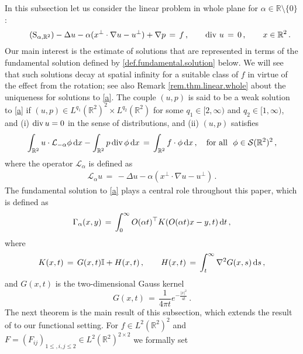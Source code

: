 \documentclass[11pt,a4paper]{article}
\newcommand{\R}{\mathbb{R}}
\newcommand{\dd}{\,{\rm d}}
\begin{document}
In this subsection let us consider the linear problem in whole plane for $\alpha\in \R \setminus \{0\}$:
%
\begin{equation}\tag{${\rm S}_{\alpha,\R^2}$}\label{a}
- \Delta u -\alpha (x^{\perp} \cdot \nabla u-u^{\perp})+ \nabla p \, =\, f\,, 
\qquad {\rm div}\ u \, =\, 0\,,  
~~~~~~ x \in  \mathbb{R}^2\,.
\end{equation}
%
Our main interest is the estimate of solutions that are represented in terms of the fundamental solution defined by \eqref{def.fundamental.solution} below. We will see that such solutions decay at spatial infinity for a suitable class of $f$ in virtue of the effect from the rotation; see also Remark \ref{rem.thm.linear.whole} about the uniqueness for  solutions to \eqref{a}. 
The couple $(u,p)$ is said to be a weak solution to \eqref{a} 
if $(u, p)\in L^{q_1}(\R^2)^2\times L^{q_2} (\R^2)$ for some $q_1\in [2,\infty)$ and $q_2\in [1,\infty)$, 
and (i) ${\rm div}\, u=0$ in the sense of distributions, and (ii) $(u,p)$ satisfies
%
\begin{equation*}\label{def.weak.whole}
\int_{\R^2}  u\cdot \mathcal{L}_{-\alpha} \phi \dd x 
- \int_{\R^2} p \, {\rm div}\, \phi \dd x  
\,=\,  \int_{\R^2} f \cdot \phi \dd x\,, \quad {\rm for~all} \ \ \phi\in \mathcal{S}(\R^2)^2\,,
\end{equation*}
%
where the operator $\mathcal{L}_{\alpha}$ is defined as
%
\begin{align*}
\mathcal{L}_{\alpha} u \,=\, -\Delta u -\alpha(x^\bot \cdot \nabla u -u^\bot)\,.
\end{align*}
%
The fundamental solution to \eqref{a} plays a central role throughout this paper, which is defined as 
%
\begin{equation}\label{def.fundamental.solution}
\Gamma_{\alpha}(x,y) \, = \,  \int_{0}^{\infty}  O(\alpha t)^{\top} K(O(\alpha t)x-y,t) \dd t\,,
\end{equation}
%
where
%
\begin{equation*}
K(x,t) \,=\, G(x,t) \mathbb{I} + H(x,t)\,,
\qquad  
H(x,t) \,=\, \int_{t}^{\infty} \nabla^2 G(x,s) \dd s\,,
\end{equation*}
%
and $G(x,t)$ is the two-dimensional Gauss kernel
%
\begin{equation*}
G(x,t) \,=\, \frac{1}{4\pi t} e^{-\frac{|x|^2}{4t}}\,.
\end{equation*}
%
The next theorem is the main result of this subsection, which extends the result of \cite{H3} to our functional setting. For $f\in L^2 (\R^2)^2$ and $F=(F_{ij})_{1\leq, i,j\leq 2} \in L^2 (\R^2)^{2\times 2}$ we formally set 
\end{document}
